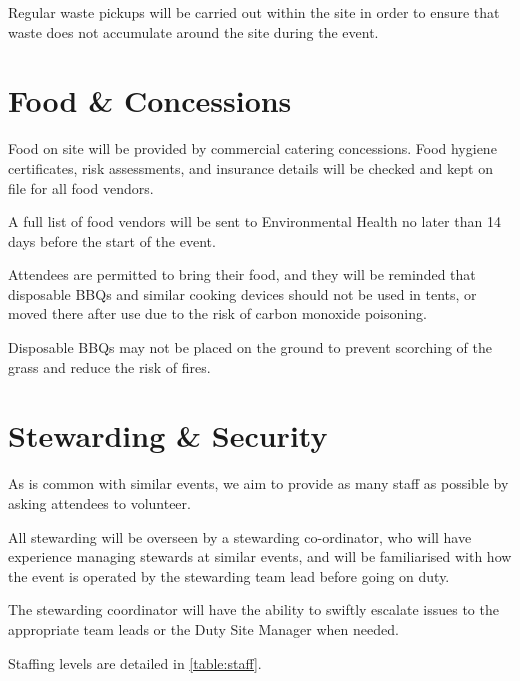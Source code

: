 Regular waste pickups will be carried out within the site in order to ensure that waste does
not accumulate around the site during the event.

\section{Food \& Concessions}\label{food}

Food on site will be provided by commercial catering concessions. Food hygiene certificates,
risk assessments, and insurance details will be checked and kept on file for all food vendors.

A full list of food vendors will be sent to Environmental Health no later than 14 days before
the start of the event.

Attendees are permitted to bring their food, and they will be reminded that disposable BBQs and
similar cooking devices should not be used in tents, or moved there after use due to the risk
of carbon monoxide poisoning.

Disposable BBQs may not be placed on the ground to prevent scorching of the grass
and reduce the risk of fires.

\section{Stewarding \& Security}

As is common with similar events, we aim to provide as many staff as possible
by asking attendees to volunteer.

All stewarding will be overseen by a stewarding co-ordinator, who
will have experience managing stewards at similar events, and will be familiarised
with how the event is operated by the stewarding team lead before going on duty.

The stewarding coordinator will have the ability to swiftly
escalate issues to the appropriate team leads or the Duty Site Manager when needed.

Staffing levels are detailed in \cref{table:staff}.

